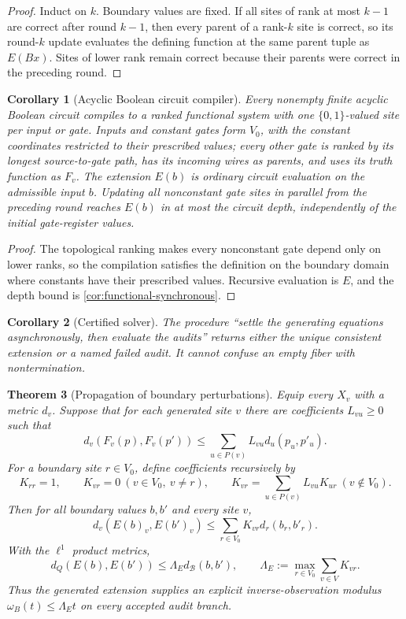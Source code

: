 \documentclass[11pt]{article}
\newtheorem{theorem}{Theorem}[section]
\newtheorem{corollary}[theorem]{Corollary}
\theoremstyle{definition}
\theoremstyle{remark}
\numberwithin{equation}{section}
\newcommand{\cB}{\mathcal B}
\begin{document}
\begin{proof}
Induct on $k$.  Boundary values are fixed.  If all sites of rank at most
$k-1$ are correct after round $k-1$, then every parent of a rank-$k$ site is
correct, so its round-$k$ update evaluates the defining function at the same
parent tuple as $E(Bx)$.  Sites of lower rank remain correct because their
parents were correct in the preceding round.
\end{proof}

\begin{corollary}[Acyclic Boolean circuit compiler]
\label{cor:boolean-circuit-compiler}
Every nonempty finite acyclic Boolean circuit compiles to a ranked functional
system with one $\{0,1\}$-valued site per input or gate.  Inputs and constant
gates form $V_0$, with the constant coordinates restricted to their prescribed
values; every other gate is ranked by its longest source-to-gate path, has its
incoming wires as parents, and uses its truth function as $F_v$.  The
extension $E(b)$ is ordinary circuit evaluation on the admissible input
$b$.  Updating all nonconstant gate sites in parallel from the preceding
round reaches $E(b)$ in at most the circuit depth, independently of the
initial gate-register values.
\end{corollary}

\begin{proof}
The topological ranking makes every nonconstant gate depend only on lower
ranks, so the compilation satisfies the definition on the boundary domain
where constants have their prescribed values.  Recursive evaluation is $E$,
and the depth bound is \cref{cor:functional-synchronous}.
\end{proof}

\begin{corollary}[Certified solver]
The procedure ``settle the generating equations asynchronously, then evaluate the audits'' returns either the unique consistent extension or a named failed audit.  It cannot confuse an empty fiber with nontermination.
\end{corollary}

\begin{theorem}[Propagation of boundary perturbations]\label{thm:functional-lipschitz}
Equip every $X_v$ with a metric $d_v$.  Suppose that for each generated site $v$ there are coefficients $L_{vu}\ge0$ such that
\[
 d_v(F_v(p),F_v(p'))
 \le
 \sum_{u\in P(v)}L_{vu}d_u(p_u,p'_u).
\]
For a boundary site $r\in V_0$, define coefficients recursively by
\[
 K_{rr}=1,
 \qquad K_{vr}=0\ (v\in V_0,\ v\ne r),
 \qquad
 K_{vr}=\sum_{u\in P(v)}L_{vu}K_{ur}\ (v\notin V_0).
\]
Then for all boundary values $b,b'$ and every site $v$,
\[
 d_v(E(b)_v,E(b')_v)
 \le
 \sum_{r\in V_0}K_{vr}d_r(b_r,b'_r).
\]
With the $\ell^1$ product metrics,
\[
 d_Q(E(b),E(b'))
 \le
 \Lambda_E d_{\cB}(b,b'),
 \qquad
 \Lambda_E:=\max_{r\in V_0}\sum_{v\in V}K_{vr}.
\]
Thus the generated extension supplies an explicit inverse-observation modulus
$\omega_B(t)\le\Lambda_Et$ on every accepted audit branch.
\end{theorem}
\end{document}

